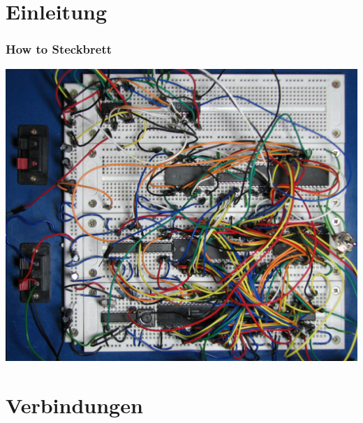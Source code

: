 


\subtitle{Technik Allgemein:         \\
           How to Steckbrett \\[2em]}
\date{Stand 20.11.2014}


\section*{Einleitung}

\begin{frame}
    \frametitle{How to Steckbrett}
    \begin{center}
        \includegraphics[width=1\textwidth]{e99/Breadboard_complex.jpg}
    \end{center}
\end{frame}


\section*{Verbindungen}

